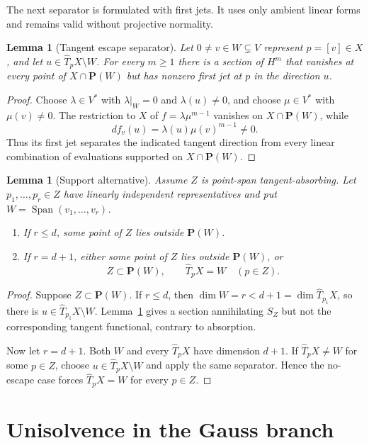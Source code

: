 \documentclass[11pt]{article}
\newtheorem{lemma}[theorem]{Lemma}
\newcommand{\PP}{\mathbf P}
\newcommand{\Span}{\operatorname{Span}}
\begin{document}
The next separator is formulated with first jets.  It uses only ambient
linear forms and remains valid without projective normality.

\begin{lemma}[Tangent escape separator]\label{lem:separator}
Let $0\neq v\in W\subsetneq V$ represent $p=[v]\in X$, and let
$u\in\widehat T_pX\setminus W$.  For every $m\geq1$ there is a section of
$H^m$ that vanishes at every point of $X\cap\PP(W)$ but has nonzero first
jet at $p$ in the direction $u$.
\end{lemma}

\begin{proof}
Choose $\lambda\in V^*$ with $\lambda|_W=0$ and $\lambda(u)\neq0$, and
choose $\mu\in V^*$ with $\mu(v)\neq0$.  The restriction to $X$ of
$f=\lambda\mu^{m-1}$ vanishes on $X\cap\PP(W)$, while
\[
 df_v(u)=\lambda(u)\mu(v)^{m-1}\neq0.
\]
Thus its first jet separates the indicated tangent direction from every
linear combination of evaluations supported on $X\cap\PP(W)$.
\end{proof}

\begin{lemma}[Support alternative]\label{lem:support-alternative}
Assume $Z$ is point-span tangent-absorbing.  Let
$p_1,\ldots,p_r\in Z$ have linearly independent representatives and put
$W=\Span(v_1,\ldots,v_r)$.
\begin{enumerate}[label=(\roman*)]
\item If $r\leq d$, some point of $Z$ lies outside $\PP(W)$.
\item If $r=d+1$, either some point of $Z$ lies outside $\PP(W)$, or
\[
 Z\subset\PP(W),\qquad \widehat T_pX=W\quad(p\in Z).
\]
\end{enumerate}
\end{lemma}

\begin{proof}
Suppose $Z\subset\PP(W)$.  If $r\leq d$, then
$\dim W=r<d+1=\dim\widehat T_{p_1}X$, so there is
$u\in\widehat T_{p_1}X\setminus W$.  Lemma~\ref{lem:separator} gives a
section annihilating $S_Z$ but not the corresponding tangent functional,
contrary to absorption.

Now let $r=d+1$.  Both $W$ and every $\widehat T_pX$ have dimension $d+1$.
If $\widehat T_pX\neq W$ for some $p\in Z$, choose
$u\in\widehat T_pX\setminus W$ and apply the same separator.  Hence the
no-escape case forces $\widehat T_pX=W$ for every $p\in Z$.
\end{proof}

\section{Unisolvence in the Gauss branch}\label{sec:gauss-unisolvence}
\end{document}
